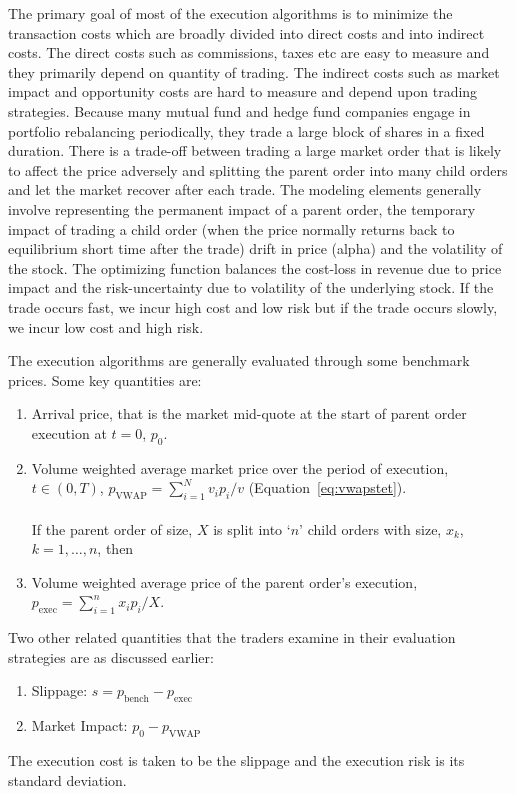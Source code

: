 The primary goal of most of the execution algorithms is to minimize the transaction costs which are broadly divided into direct costs and into indirect costs. The direct costs such as commissions, taxes etc are easy to measure and they primarily depend on quantity of trading. The indirect costs such as market impact and opportunity costs are hard to measure and depend upon trading strategies. Because many mutual fund and hedge fund companies engage in portfolio rebalancing periodically, they trade a large block of shares in a fixed duration. There is a trade-off between trading a large market order that is likely to affect the price adversely and splitting the parent order into many child orders and let the market recover after each trade. The modeling elements generally involve representing the permanent impact of a parent order, the temporary impact of trading a child order (when the price normally returns back to equilibrium short time after the trade) drift in price (alpha) and the volatility of the stock. The optimizing function balances the cost-loss in revenue due to price impact and the risk-uncertainty due to volatility of the underlying stock. If the trade occurs fast, we incur high cost and low risk but if the trade occurs slowly, we incur low cost and high risk.


The execution algorithms are generally evaluated through some benchmark prices. Some key quantities are:
	\begin{enumerate}[--]
	\item Arrival price, that is the market mid-quote at the start of parent order execution at $t=0$, $p_0$.
	\item Volume weighted average market price over the period of execution, $t \in (0,T)$, $p_{\text{VWAP}}= \sum_{i=1}^N v_ip_i/v$ (Equation~\ref{eq:vwapstet}). \\ \\
	If the parent order of size, $X$ is split into `$n$' child orders with size, $x_k$, $k=1,\ldots,n$, then
	\item Volume weighted average price of the parent order's execution, $p_{\text{exec}}= \sum_{i=1}^n x_ip_i/X$. 
	\end{enumerate}
	
Two other related quantities that the traders examine in their evaluation strategies are as discussed earlier:
	\begin{enumerate}[--]
	\item Slippage: $s= p_{\text{bench}} - p_{\text{exec}}$
	\item Market Impact: $p_0 - p_{\text{VWAP}}$
	\end{enumerate}
The execution cost is taken to be the slippage and the execution risk is its standard deviation. 


